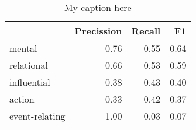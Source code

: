 \begin{table}[!ht]
\centering
\begin{tabular}{lrrr}
\toprule
{} &  Precission &  Recall &   F1 \\
\midrule
mental         &        0.76 &    0.55 & 0.64 \\
relational     &        0.66 &    0.53 & 0.59 \\
influential    &        0.38 &    0.43 & 0.40 \\
action         &        0.33 &    0.42 & 0.37 \\
event-relating &        1.00 &    0.03 & 0.07 \\
\bottomrule
\end{tabular}
\caption{My caption here}
\label{tab:PROCESS_TYPE-oe-combined-F1}
\end{table}